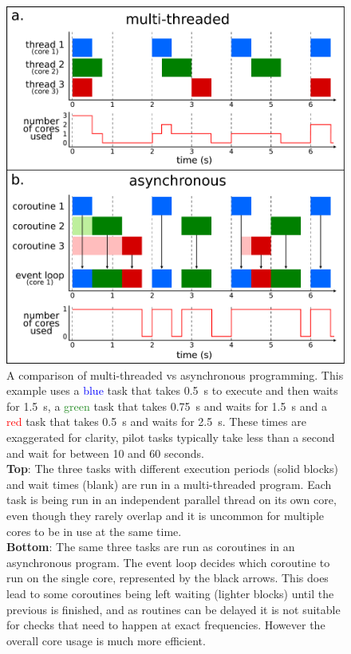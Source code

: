 \begin{colsection}
\begin{colsection}
\begin{figure}[p]
    \begin{center}
        \includegraphics[width=0.9\linewidth]{images/async.pdf}
    \end{center}
    \caption[Multi-threaded vs asynchronous programming]{
        A comparison of multi-threaded vs asynchronous programming. This example uses a \textcolor{blue}{blue} task that takes \SI{0.5}{\second} to execute and then waits for \SI{1.5}{\second}, a \textcolor{ForestGreen}{green} task that takes \SI{0.75}{\second} and waits for \SI{1.5}{\second} and a \textcolor{red}{red} task that takes \SI{0.5}{\second} and waits for \SI{2.5}{\second}. These times are exaggerated for clarity, pilot tasks typically take less than a second and wait for between 10 and 60 seconds. \\
        \textbf{Top}: The three tasks with different execution periods (solid blocks) and wait times (blank) are run in a multi-threaded program. Each task is being run in an independent parallel thread on its own core, even though they rarely overlap and it is uncommon for multiple cores to be in use at the same time. \\
        \textbf{Bottom}: The same three tasks are run as coroutines in an asynchronous program. The event loop decides which coroutine to run on the single core, represented by the black arrows. This does lead to some coroutines being left waiting (lighter blocks) until the previous is finished, and as routines can be delayed it is not suitable for checks that need to happen at exact frequencies. However the overall core usage is much more efficient.
    }\label{fig:async}
\end{figure}


\end{colsection}
\end{colsection}
